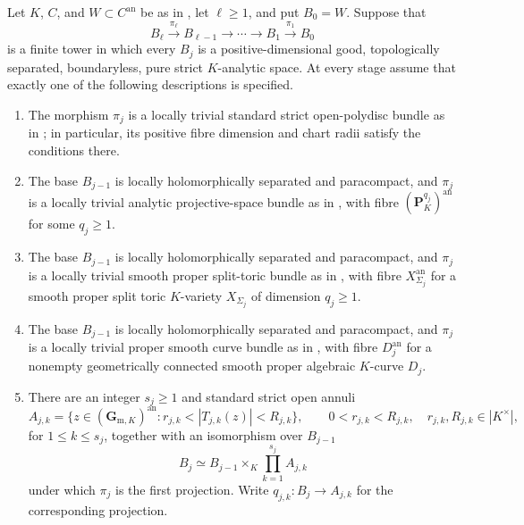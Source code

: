 \begin{theorem}
\label{thm:p062-interleaved-polyannulus-mixed-bundle-towers}
Let $K$, $C$, and $W\subset C^{\mathrm{an}}$ be as in
, let $\ell\geq1$, and put $B_0=W$.
Suppose that
\[
 B_\ell\xrightarrow{\pi_\ell}B_{\ell-1}
 \longrightarrow\cdots\longrightarrow B_1
 \xrightarrow{\pi_1}B_0
\]
is a finite tower in which every $B_j$ is a positive-dimensional good,
topologically separated, boundaryless, pure strict $K$-analytic space.  At
every stage assume that exactly one of the following descriptions is
specified.
\begin{enumerate}
\item The morphism $\pi_j$ is a locally trivial standard strict
open-polydisc bundle as in
; in particular, its positive
fibre dimension and chart radii satisfy the conditions there.
\item The base $B_{j-1}$ is locally holomorphically separated and
paracompact, and $\pi_j$ is a locally trivial analytic projective-space
bundle as in , with fibre
$(\mathbf P_K^{q_j})^{\mathrm{an}}$ for some $q_j\geq1$.
\item The base $B_{j-1}$ is locally holomorphically separated and
paracompact, and $\pi_j$ is a locally trivial smooth proper split-toric
bundle as in
, with fibre
$X_{\Sigma_j}^{\mathrm{an}}$ for a smooth proper split toric $K$-variety
$X_{\Sigma_j}$ of dimension $q_j\geq1$.
\item The base $B_{j-1}$ is locally holomorphically separated and
paracompact, and $\pi_j$ is a locally trivial proper smooth curve bundle as
in , with fibre
$D_j^{\mathrm{an}}$ for a nonempty geometrically connected smooth proper
algebraic $K$-curve $D_j$.
\item There are an integer $s_j\geq1$ and standard strict open annuli
\[
 A_{j,k}=\{z\in(\mathbf G_{\mathrm m,K})^{\mathrm{an}}:
                 r_{j,k}<|T_{j,k}(z)|<R_{j,k}\},
 \qquad 0<r_{j,k}<R_{j,k},\quad r_{j,k},R_{j,k}\in|K^\times|,
\]
for $1\leq k\leq s_j$, together with an isomorphism over $B_{j-1}$
\[
 B_j\simeq B_{j-1}\times_K\prod_{k=1}^{s_j}A_{j,k}
\]
under which $\pi_j$ is the first projection.  Write
$q_{j,k}:B_j\to A_{j,k}$ for the corresponding projection.
\end{enumerate}

\end{theorem}
